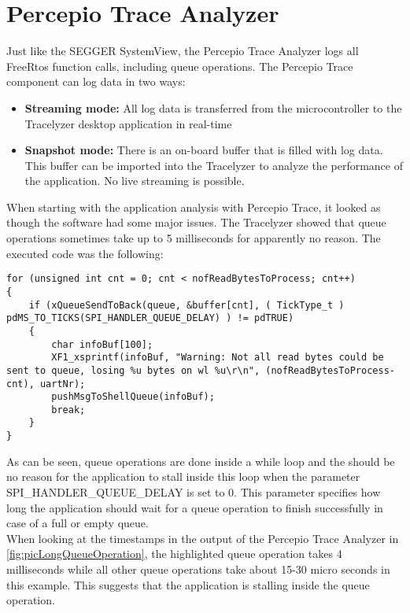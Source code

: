 \section{Percepio Trace Analyzer} \label{sec:SystemAnalysis}
Just like the SEGGER SystemView, the Percepio Trace Analyzer logs all FreeRtos function calls, including queue operations. 
The Percepio Trace component can log data in two ways:
\begin{itemize}
    \item \textbf{Streaming mode:} All log data is transferred from the microcontroller to the Tracelyzer desktop application in real-time
    \item \textbf{Snapshot mode:} There is an on-board buffer that is filled with log data. This buffer can be imported into the Tracelyzer to analyze the performance of the application. No live streaming is possible.
\end{itemize}
When starting with the application analysis with Percepio Trace, it looked as though the software had some major issues. The Tracelyzer showed that queue operations sometimes take up to 5 milliseconds for apparently no reason. The executed code was the following:
\begin{lstlisting}
for (unsigned int cnt = 0; cnt < nofReadBytesToProcess; cnt++)
{
    if (xQueueSendToBack(queue, &buffer[cnt], ( TickType_t ) pdMS_TO_TICKS(SPI_HANDLER_QUEUE_DELAY) ) != pdTRUE)
    {
        char infoBuf[100];
        XF1_xsprintf(infoBuf, "Warning: Not all read bytes could be sent to queue, losing %u bytes on wl %u\r\n", (nofReadBytesToProcess-cnt), uartNr);
        pushMsgToShellQueue(infoBuf);
        break;
    }
}
\end{lstlisting}
%
As can be seen, queue operations are done inside a while loop and the should be no reason for the application to stall inside this loop when the parameter SPI\_HANDLER\_QUEUE\_DELAY is set to 0. This parameter specifies how long the application should wait for a queue operation to finish successfully in case of a full or empty queue.\\
When looking at the timestamps in the output of the Percepio Trace Analyzer in \autoref{fig:picLongQueueOperation}, the highlighted queue operation takes 4 milliseconds while all other queue operations take about 15-30 micro seconds in this example. This suggests that the application is stalling inside the queue operation.\\
